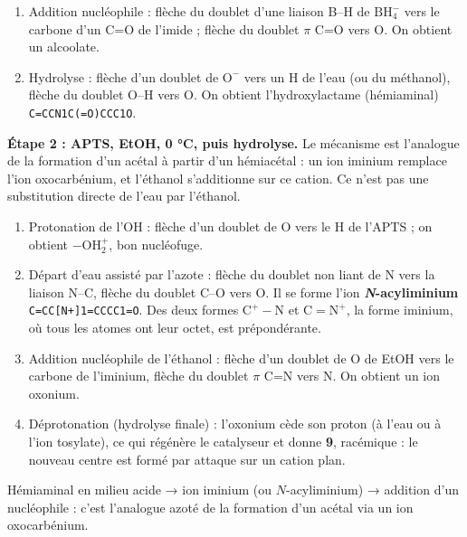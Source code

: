 \documentclass[11pt,a4paper]{article}
\providecommand{\tightlist}{\setlength{\itemsep}{0pt}\setlength{\parskip}{0pt}}
\begin{document}
\begin{enumerate}
\def\labelenumi{\arabic{enumi}.}
\tightlist
\item
  Addition nucléophile : flèche du doublet d'une liaison B--H de \(\mathrm{BH_4^-}\) vers le carbone d'un C=O de l'imide ; flèche du doublet \(\pi\) C=O vers O. On obtient un alcoolate.
\item
  Hydrolyse : flèche d'un doublet de \(\mathrm{O^-}\) vers un H de l'eau (ou du méthanol), flèche du doublet O--H vers O. On obtient l'hydroxylactame (hémiaminal) \texttt{C=CCN1C(=O)CCC1O}.
\end{enumerate}

\textbf{Étape 2 : APTS, EtOH, 0 °C, puis hydrolyse.} Le mécanisme est l'analogue de la formation d'un acétal à partir d'un hémiacétal : un ion iminium remplace l'ion oxocarbénium, et l'éthanol s'additionne sur ce cation. Ce n'est pas une substitution directe de l'eau par l'éthanol.

\begin{enumerate}
\def\labelenumi{\arabic{enumi}.}
\setcounter{enumi}{2}
\tightlist
\item
  Protonation de l'OH : flèche d'un doublet de O vers le H de l'APTS ; on obtient \(\mathrm{{-}OH_2^+}\), bon nucléofuge.
\item
  Départ d'eau assisté par l'azote : flèche du doublet non liant de N vers la liaison N--C, flèche du doublet C--O vers O. Il se forme l'ion \textbf{\emph{N}-acyliminium} \texttt{C=\allowbreak{}CC{[}N+{]}\allowbreak{}1=\allowbreak{}CCCC1=\allowbreak{}O}. Des deux formes \(\mathrm{C^+{-}N}\) et \(\mathrm{C{=}N^+}\), la forme iminium, où tous les atomes ont leur octet, est prépondérante.
\item
  Addition nucléophile de l'éthanol : flèche d'un doublet de O de EtOH vers le carbone de l'iminium, flèche du doublet \(\pi\) C=N vers N. On obtient un ion oxonium.
\item
  Déprotonation (hydrolyse finale) : l'oxonium cède son proton (à l'eau ou à l'ion tosylate), ce qui régénère le catalyseur et donne \textbf{9}, racémique : le nouveau centre est formé par attaque sur un cation plan.
\end{enumerate}

\begin{methode}

Hémiaminal en milieu acide → ion iminium (ou \(N\)-acyliminium) → addition d'un nucléophile : c'est l'analogue azoté de la formation d'un acétal via un ion oxocarbénium.

\end{methode}
\end{document}
